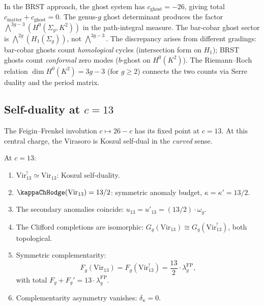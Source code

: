 \begin{remark}
In the BRST approach, the ghost system has $c_{\mathrm{ghost}} = -26$,
giving total $c_{\mathrm{matter}} + c_{\mathrm{ghost}} = 0$. The
genus-$g$ ghost determinant produces the factor
$\bigwedge^{3g-3}(H^0(\Sigma_g, K^2))$ in the path-integral measure.
The bar-cobar ghost sector is $\bigwedge^{2g}(H_1(\Sigma_g))$, not
$\bigwedge^{3g-3}$. The discrepancy arises from different
gradings: bar-cobar ghosts count \emph{homological} cycles
(intersection form on $H_1$); BRST ghosts count \emph{conformal}
zero modes ($b$-ghost on $H^0(K^2)$). The Riemann--Roch relation
$\dim H^0(K^2) = 3g-3$ (for $g \geq 2$) connects the two counts
via Serre duality and the period matrix.
\end{remark}

%
%

\subsection{Self-duality at $c = 13$}

The Feigin--Frenkel involution $c \mapsto 26 - c$ has its fixed point
at $c = 13$. At this central charge, the Virasoro is Koszul self-dual
in the \emph{curved} sense.

\begin{theorem}[Virasoro self-duality at $c = 13$;
\ClaimStatusProvedHere]
At $c = 13$:
\begin{enumerate}[label=\textup{(\roman*)}]
\item $\mathrm{Vir}_{13}^! \simeq \mathrm{Vir}_{13}$: Koszul
self-duality.

\item $\kappaChHodge(\mathrm{Vir}_{13}) = 13/2$: symmetric anomaly budget,
$\kappa = \kappa' = 13/2$.

\item The secondary anomalies coincide:
$u_{13} = u'_{13} = (13/2) \cdot \omega_g$.

\item The Clifford completions are isomorphic:
$G_g(\mathrm{Vir}_{13}) \cong G_g(\mathrm{Vir}_{13}^!)$, both
topological.

\item Symmetric complementarity:
\begin{equation}%
F_g(\mathrm{Vir}_{13}) = F_g(\mathrm{Vir}_{13}^!)
= \frac{13}{2} \cdot \lambda_g^{\mathrm{FP}},
\end{equation}
with total $F_g + F_g' = 13 \cdot \lambda_g^{\mathrm{FP}}$.

\item Complementarity asymmetry vanishes: $\delta_\kappa = 0$.
\end{enumerate}
\end{theorem}

